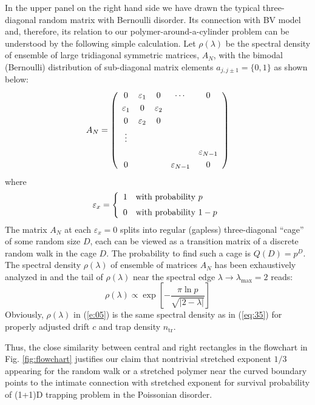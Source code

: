 \documentclass[aps,pre,floatfix,twocolumn,nofootinbib]{revtex4-2}
\newcommand{\be}{\begin{equation}}
\newcommand{\ee}{\end{equation}}
\newcommand{\eq}[1]{(\ref{#1})}
\newcommand{\eps}{\varepsilon}
\begin{document}
In the upper panel on the right hand side we have drawn the typical three-diagonal random matrix with Bernoulli disorder.  Its connection with BV model and, therefore, its relation to our polymer-around-a-cylinder problem can be understood by the following simple calculation.  Let $\rho(\lambda)$ be the spectral density of ensemble of large tridiagonal symmetric matrices, $A_N$, with the bimodal (Bernoulli) distribution of sub-diagonal matrix elements $a_{j,j\pm 1}=\{0,1\}$ as shown below:
\be
A_N = \left(\begin{array}{ccccc}
0 & \eps_1 & 0 & \cdots & 0 \smallskip \\  \eps_1 & 0 & \eps_2 & & \smallskip \\  0 & \eps_2 & 0 & & \smallskip \\ \vdots &  &  &  & \smallskip \\ & & & & \eps_{N-1} \smallskip \\ 0 & & & \eps_{N-1} & 0 \end{array} \right)
\label{e:04c}
\ee
where
\be
\eps_x=\left\{\begin{array}{ll} 1 & \mbox{with probability $p$} \medskip \\
0 & \mbox{with probability $1-p$} \end{array} \right.
\label{e:04d}
\ee
The matrix $A_N$ at each $\eps_x=0$ splits into regular (gapless) three-diagonal ``cage'' of some random size $D$, each can be viewed as a transition matrix of a discrete random walk in the cage $D$. The probability to find such a cage is $Q(D) = p^D$. The spectral density $\rho(\lambda)$ of ensemble of matrices $A_N$ has been exhaustively analyzed in \cite{krapiv,polov} and the tail of $\rho(\lambda)$ near the spectral edge $\lambda\to\lambda_{\max}=2$ reads:
\be
\rho(\lambda)\propto \exp \left[- \frac{\pi \ln p}{\sqrt{|2 - \lambda|}} \right]
\label{e:05}
\ee
Obviously, $\rho(\lambda)$ in \eq{e:05} is the same spectral density as in \eq{eq:35} for properly adjusted drift $c$ and trap density $n_{\mathrm{tr}}$.

Thus, the close similarity between central and right rectangles in the flowchart in Fig. \ref{fig:flowchart} justifies our claim that nontrivial stretched exponent $1/3$ appearing for the random walk or a stretched polymer near the curved boundary points to the intimate connection with stretched exponent for survival probability of (1+1)D trapping problem in the Poissonian disorder.
\end{document}
